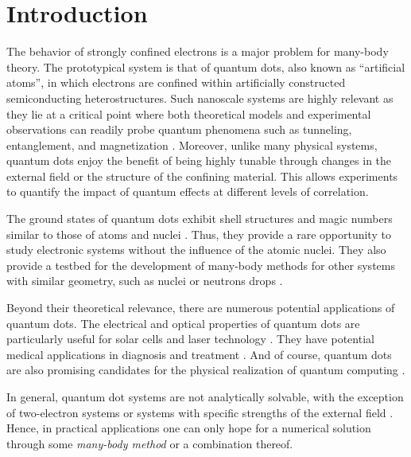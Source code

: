 \maketitle

\section{Introduction}

The behavior of strongly confined electrons is a major problem for many-body theory.  The prototypical system is that of quantum dots, also known as ``artificial atoms'', in which electrons are confined within artificially constructed semiconducting heterostructures.  Such nanoscale systems are highly relevant as they lie at a critical point where both theoretical models and experimental observations can readily probe quantum phenomena such as tunneling, entanglement, and magnetization \cite{reimann2002,engel1993}.  Moreover, unlike many physical systems, quantum dots enjoy the benefit of being highly tunable through changes in the external field or the structure of the confining material.  This allows experiments to quantify the impact of quantum effects at different levels of correlation.

The ground states of quantum dots exhibit shell structures and magic numbers similar to those of atoms and nuclei \cite{tarucha1996}.  Thus, they provide a rare opportunity to study electronic systems without the influence of the atomic nuclei.  They also provide a testbed for the development of many-body methods for other systems with similar geometry, such as nuclei or neutrons drops \cite{PhysRevC.84.044306}.

Beyond their theoretical relevance, there are numerous potential applications of quantum dots.  The electrical and optical properties of quantum dots are particularly useful for solar cells \cite{jenks:013111,doi:10.1021/cr900289f} and laser technology \cite{strauf2010,5075760}.  They have potential medical applications in diagnosis and treatment \cite{Ben-Ari02042003}.  And of course, quantum dots are also promising candidates for the physical realization of quantum computing \cite{PhysRevA.57.120}.

In general, quantum dot systems are not analytically solvable, with the exception of two-electron systems or systems with specific strengths of the external field \cite{PhysRevA.48.3561}.  Hence, in practical applications one can only hope for a numerical solution through some \textit{many-body method} or a combination thereof.

